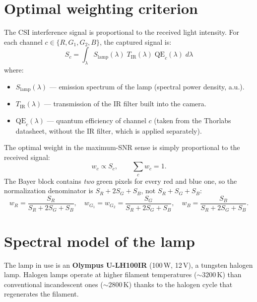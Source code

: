 \documentclass[11pt, a4paper]{article}
\begin{document}
\section{Optimal weighting criterion}

The CSI interference signal is proportional to the received light
intensity. For each channel $c \in \{R, G_1, G_2, B\}$, the captured
signal is:
\begin{equation}
  S_c = \int_{\lambda} S_{\mathrm{lamp}}(\lambda)\;
                       T_{\mathrm{IR}}(\lambda)\;
                       \mathrm{QE}_c(\lambda)\;d\lambda
  \label{eq:signal}
\end{equation}
where:
\begin{itemize}[noitemsep]
  \item $S_{\mathrm{lamp}}(\lambda)$ — emission spectrum of the lamp
        (spectral power density, a.u.).
  \item $T_{\mathrm{IR}}(\lambda)$ — transmission of the IR filter built
        into the camera.
  \item $\mathrm{QE}_c(\lambda)$ — quantum efficiency of channel $c$
        (taken from the Thorlabs datasheet, without the IR filter, which
        is applied separately).
\end{itemize}

The optimal weight in the maximum-SNR sense is simply proportional to
the received signal:
\begin{equation}
  w_c \propto S_c, \qquad \sum_c w_c = 1.
  \label{eq:weights}
\end{equation}
The Bayer block contains \emph{two} green pixels for every red and blue
one, so the normalization denominator is $S_R + 2S_G + S_B$, not
$S_R + S_G + S_B$:
\begin{equation}
  w_R = \frac{S_R}{S_R + 2S_G + S_B}, \quad
  w_{G_1} = w_{G_2} = \frac{S_G}{S_R + 2S_G + S_B}, \quad
  w_B = \frac{S_B}{S_R + 2S_G + S_B}.
  \label{eq:normweights}
\end{equation}

\section{Spectral model of the lamp}

The lamp in use is an \textbf{Olympus U-LH100IR} (100\,W, 12\,V), a
tungsten halogen lamp. Halogen lamps operate at higher filament
temperatures (${\sim}3200$\,K) than conventional incandescent ones
(${\sim}2800$\,K) thanks to the halogen cycle that regenerates the
filament.
\end{document}
